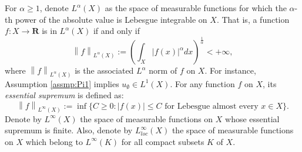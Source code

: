 \documentclass[a4paper, 11pt]{amsart}
\numberwithin{equation}{section}
\theoremstyle{plain}
\newtheorem{assumption}{Assumption}
\theoremstyle{definition}
\theoremstyle{remark}
\newcommand{\R}{\mathbf{R}}
\newcommand{\norm}[1]{\left\lVert#1\right\rVert}
\begin{document}


For $\alpha \ge 1$, denote $L^{\alpha}(X)$ as the space of measurable functions for which the $\alpha$-th power of the absolute value is Lebesgue integrable on $X$. That is, a function $f: X\rightarrow \R$ is in $L^{\alpha}(X)$ if and only if 
$$\norm{f}_{L^{\alpha}(X)}:= \left(\int_{X} |f(x)|^{\alpha} dx \right)^{\frac{1}{\alpha}} <+\infty,$$
where $\norm{f}_{L^{\alpha}(X)}$ is the associated $L^{\alpha}$ norm of $f$ on $X$.  
For instance, Assumption \ref{assmp:Pi1} implies $u_{\emptyset}\in L^{1}(X)$.  For any function $f$ on $X$, its {\em essential supremum} is defined as:
	\begin{equation}
		\norm{f}_{L^{\infty}(X)} := \inf\{C\ge 0: |f(x)| \le C \text{ for Lebesgue almost every } x \in X \}.
	\end{equation}
Denote by $L^{\infty}(X)$ the space of measurable functions on $X$ whose essential supremum is finite. Also, denote by $L_{loc}^{\infty}(X)$ the space of measurable functions on $X$ which belong to $L^{\infty}(K)$ for all compact subsets $K$ of $X$. \medskip



 

 







\bigskip
\end{document}
